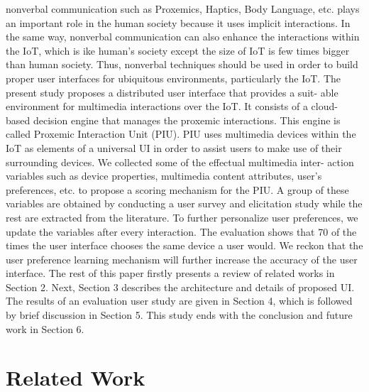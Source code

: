 \documentclass[runningheads,a4paper]{llncs}
\begin{document}
nonverbal communication such as Proxemics, Haptics, Body Language, etc. plays an important role in the human society because it uses implicit interactions. In the same way, nonverbal communication can also enhance the interactions within the IoT, which is ike human’s society except the size of IoT is few times bigger than human society. Thus, nonverbal techniques should be used in order to build proper user interfaces for ubiquitous environments, particularly the IoT. 
\newline
\newline
The present study proposes a distributed user interface that provides a suit- able environment for multimedia interactions over the IoT. It consists of a cloud- based decision engine that manages the proxemic interactions. This engine is called Proxemic Interaction Unit (PIU). PIU uses multimedia devices within the IoT as elements of a universal UI in order to assist users to make use of their surrounding devices. We collected some of the effectual multimedia inter- action variables such as device properties, multimedia content attributes, user’s preferences, etc. to propose a scoring mechanism for the PIU. A group of these variables are obtained by conducting a user survey and elicitation study while the rest are extracted from the literature. To further personalize user preferences, we update the variables after every interaction. The evaluation shows that 70  of the times the user interface chooses the same device a user would. We reckon that the user preference learning mechanism will further increase the accuracy of the user interface. 
\newline
The rest of this paper firstly presents a review of related works in Section 2. Next, Section 3 describes the architecture and details of proposed UI. The results of an evaluation user study are given in Section 4, which is followed by brief discussion in Section 5. This study ends with the conclusion and future work in Section 6. 





\section{Related Work }
\end{document}
